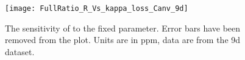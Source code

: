  


\begin{figure}
    \centering
    \texttt{[image: FullRatio\_R\_Vs\_kappa\_loss\_Canv\_9d]}
    \caption[Scan over fixed \K]{The sensitivity of \R to the fixed \K parameter. Error bars have been removed from the plot. Units are in ppm, data are from the 9d dataset.}
    \label{fig:kappaLossScan}
\end{figure}



